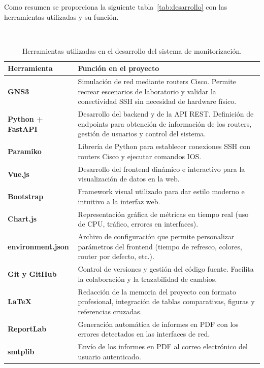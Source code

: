 Como resumen se proporciona la siguiente tabla~\ref{tab:desarrollo} con las herramientas utilizadas y su función.


\begin{table}[H]
\centering
\small
\setlength{\tabcolsep}{8pt}
\renewcommand{\arraystretch}{1.2}
\caption{Herramientas utilizadas en el desarrollo del sistema de monitorización.}\label{tab:desarrollo}\\
\label{tab:herramientas}
\begin{tabular}{p{3.5cm} p{10.5cm}}
\toprule
\textbf{Herramienta} & \textbf{Función en el proyecto} \\
\midrule
\textbf{GNS3} & Simulación de red mediante routers Cisco. Permite recrear escenarios de laboratorio y validar la conectividad SSH sin necesidad de hardware físico. \\
\textbf{Python + FastAPI} & Desarrollo del backend y de la API REST. Definición de endpoints para obtención de información de los routers, gestión de usuarios y control del sistema. \\
\textbf{Paramiko} & Librería de Python para establecer conexiones SSH con routers Cisco y ejecutar comandos IOS. \\
\textbf{Vue.js} & Desarrollo del frontend dinámico e interactivo para la visualización de datos en la web. \\
\textbf{Bootstrap} & Framework visual utilizado para dar estilo moderno e intuitivo a la interfaz web. \\
\textbf{Chart.js} & Representación gráfica de métricas en tiempo real (uso de CPU, tráfico, errores en interfaces). \\
\textbf{environment.json} & Archivo de configuración que permite personalizar parámetros del frontend (tiempo de refresco, colores, router por defecto, etc.). \\
\textbf{Git y GitHub} & Control de versiones y gestión del código fuente. Facilita la colaboración y la trazabilidad de cambios. \\
\textbf{LaTeX} & Redacción de la memoria del proyecto con formato profesional, integración de tablas comparativas, figuras y referencias cruzadas. \\
\textbf{ReportLab} & Generación automática de informes en PDF con los errores detectados en las interfaces de red. \\
\textbf{smtplib} & Envío de los informes en PDF al correo electrónico del usuario autenticado. \\
\bottomrule
\end{tabular}
\end{table}


